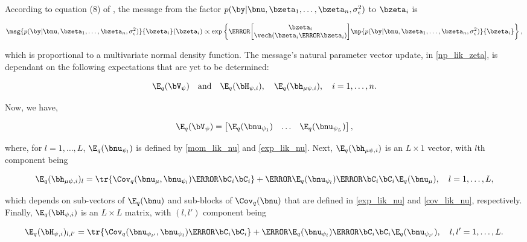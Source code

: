 \documentclass[12pt]{article}
\theoremstyle{plain}
\theoremstyle{definition}
\theoremstyle{remark}
\def\sigsqeps{\sigma^2_{\epsilon}}
\def\numu{\bnu_\mu}
\def\Vpsi{\bV_\psi}
\newcommand\nupsi[1]{\bnu_{\psi_{#1}}}
\newcommand\hmupsi[1]{\bh_{\mu \psi, #1}}
\newcommand\Hpsi[1]{\bH_{\psi, #1}}
\begin{document}
\noindent According to equation (8) of \citet{wand17}, the message from the factor
$p (\by | \bnu, \bzeta_1, \dots, \bzeta_n, \sigsqeps)$ to $\bzeta_i$ is 

\[
	\msg{p (\by | \bnu, \bzeta_1, \dots, \bzeta_n, \sigsqeps)}{\bzeta_i} (\bzeta_i) \propto
		\exp \left\{
			\T{\begin{bmatrix}
				\bzeta_i \\
				\vech (\bzeta_i \T{\bzeta_i})
			\end{bmatrix}}
			\np{p (\by | \bnu, \bzeta_1, \dots, \bzeta_n, \sigsqeps)}{\bzeta_i}
		\right\},
\]

\noindent which
is proportional to a multivariate normal density function. The message's natural parameter vector update, in
\eqref{np_lik_zeta}, is dependant on the following expectations that are yet to be determined:

\[
	\E_q (\Vpsi) \quad \text{and} \quad \E_q (\Hpsi{i}), \quad \E_q (\hmupsi{i}), \quad i = 1, \dots, n.
\]

\noindent Now, we have,

\begin{equation}
	\E_q (\Vpsi) = \begin{bmatrix}
		\E_q (\nupsi{1}) & \dots & \E_q (\nupsi{L})
	\end{bmatrix},
\label{E_q_Vpsi}
\end{equation}

\noindent where, for $l = 1, \dots, L$, $\E_q (\nupsi{l})$ is defined by \eqref{mom_lik_nu} and \eqref{exp_lik_nu}.
Next, $\E_q (\hmupsi{i})$ is an $L \times 1$ vector, with $l$th component being

\begin{equation}
	\E_q (\hmupsi{i})_l =
		\tr \{ \Cov_q (\numu, \nupsi{l}) \T{\bC_i} \bC_i \}
		+ \T{\E_q (\nupsi{l})} \T{\bC_i} \bC_i \E_q (\numu), \quad
	l = 1, \dots, L,
\label{exp_lik_hmupsi}
\end{equation}

\noindent which depends on sub-vectors of $\E_q (\bnu)$ and sub-blocks of $\Cov_q (\bnu)$ that are defined
in \eqref{exp_lik_nu} and \eqref{cov_lik_nu}, respectively. Finally, $\E_q (\Hpsi{i})$ is an $L \times L$ matrix,
with $(l, l')$ component being

\begin{equation}
	\E_q (\Hpsi{i})_{l, l'} =
		\tr \{ \Cov_q (\nupsi{l'}, \nupsi{l}) \T{\bC_i} \bC_i \}
		+ \T{\E_q (\nupsi{l})} \T{\bC_i} \bC_i \E_q (\nupsi{l'}), \quad
	l, l' = 1, \dots, L.
\label{exp_lik_Hpsi}
\end{equation}
\end{document}
